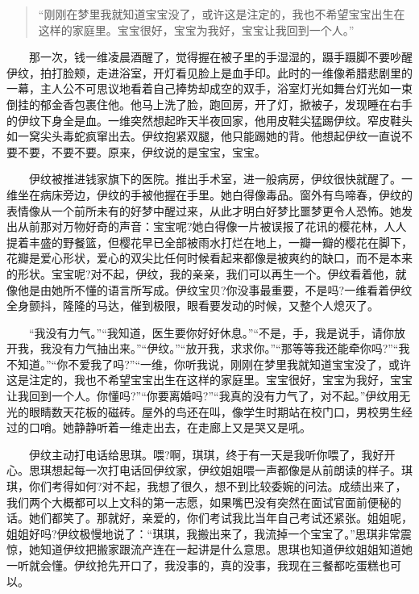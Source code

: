 \documentclass[12pt,UTF8]{ctexbook}
\begin{document}
\begin{quote}
\enquote{刚刚在梦里我就知道宝宝没了，或许这是注定的，我也不希望宝宝出生在这样的家庭里。宝宝很好，宝宝为我好，宝宝让我回到一个人。}
\end{quote}

　　那一次，钱一维凌晨酒醒了，觉得握在被子里的手湿湿的，蹑手蹑脚不要吵醒伊纹，拍打脸颊，走进浴室，开灯看见脸上是血手印。此时的一维像希腊悲剧里的一幕，主人公不可思议地看着自己捧势却成空的双手，浴室灯光如舞台灯光如一束倒挂的郁金香包裹住他。他马上洗了脸，跑回房，开了灯，掀被子，发现睡在右手的伊纹下身全是血。一维突然想起昨天半夜回家，他用皮鞋尖猛踢伊纹。窄皮鞋头如一窝尖头毒蛇疯窜出去。伊纹抱紧双腿，他只能踢她的背。他想起伊纹一直说不要不要，不要不要。原来，伊纹说的是宝宝，宝宝。

　　伊纹被推进钱家旗下的医院。推出手术室，进一般病房，伊纹很快就醒了。一维坐在病床旁边，伊纹的手被他握在手里。她白得像毒品。窗外有鸟啼春，伊纹的表情像从一个前所未有的好梦中醒过来，从此才明白好梦比噩梦更令人恐怖。她发出从前那对万物好奇的声音：宝宝呢?她白得像一片被误报了花讯的樱花林，人人提着丰盛的野餐篮，但樱花早已全部被雨水打烂在地上，一瓣一瓣的樱花在脚下，花瓣是爱心形状，爱心的双尖比任何时候看起来都像是被爽约的缺口，而不是本来的形状。宝宝呢?对不起，伊纹，我的亲亲，我们可以再生一个。伊纹看着他，就像他是由她所不懂的语言所写成。伊纹宝贝?你没事最重要，不是吗?一维看着伊纹全身颤抖，隆隆的马达，催到极限，眼看要发动的时候，又整个人熄灭了。

　　\enquote{我没有力气。}\enquote{我知道，医生要你好好休息。}\enquote{不是，手，我是说手，请你放开我，我没有力气抽出来。}\enquote{伊纹。}\enquote{放开我，求求你。}\enquote{那等等我还能牵你吗?}\enquote{我不知道。}\enquote{你不爱我了吗?}\enquote{一维，你听我说，刚刚在梦里我就知道宝宝没了，或许这是注定的，我也不希望宝宝出生在这样的家庭里。宝宝很好，宝宝为我好，宝宝让我回到一个人。你懂吗?}\enquote{你要离婚吗?}\enquote{我真的没有力气了，对不起。}伊纹用无光的眼睛数天花板的磁砖。屋外的鸟还在叫，像学生时期站在校门口，男校男生经过的口哨。她静静听着一维走出去，在走廊上又是哭又是吼。

　　伊纹主动打电话给思琪。喂?啊，琪琪，终于有一天是我听你喂了，我好开心。思琪想起每一次打电话回伊纹家，伊纹姐姐喂一声都像是从前朗读的样子。琪琪，你们考得如何?对不起，我想了很久，想不到比较委婉的问法。成绩出来了，我们两个大概都可以上文科的第一志愿，如果嘴巴没有突然在面试官面前便秘的话。她们都笑了。那就好，亲爱的，你们考试我比当年自己考试还紧张。姐姐呢，姐姐好吗?伊纹极慢地说了：\enquote{琪琪，我搬出来了，我流掉一个宝宝了。}思琪非常震惊，她知道伊纹把搬家跟流产连在一起讲是什么意思。思琪也知道伊纹姐姐知道她一听就会懂。伊纹抢先开口了，我没事的，真的没事，我现在三餐都吃蛋糕也可以。
\end{document}
